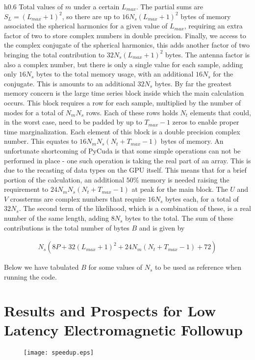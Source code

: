 \documentclass[paper=a4, fontsize=11pt]{scrartcl} %
\numberwithin{equation}{section} %
\numberwithin{figure}{section} %
\numberwithin{table}{section} %
\begin{document}
\begin{wrapfigure}{h}{0.6\textwidth}
Total values of $m$ under a certain $L_{max}$. The partial sums are $S_L = (L_{max} + 1)^2$, so there are up to $16N_s(L_{max}+1)^2$ bytes of memory associated the spherical harmonics for a given value of $L_{max}$, requiring an extra factor of two to store complex numbers in double precision. Finally, we access to the complex conjugate of the spherical harmonics, this adds another factor of two bringing the total contribution to $32N_s(L_{max}+1)^2$ bytes.  
The antenna factor is also a complex number, but there is only a single value for each sample, adding only $16N_s$ bytes to the total memory usage, with an additional $16N_s$ for the conjugate. This is amounts to an additional $32N_s$ bytes. 
By far the greatest memory concern is the large time series block inside which the main calculation occurs. This block requires a row for each sample, multiplied by the number of modes for a total of $N_m N_s$ rows. Each of these rows holds $N_t$ elements that could, in the worst case, need to be padded by up to $T_{max} - 1$ zeros to enable proper time marginalization. Each element of this block is a double precision complex number. This equates to $16N_m N_s (N_t + T_{max} - 1)$ bytes of memory. An unfortunate shortcoming of PyCuda is that some simple operations can not be performed in place - one such operation is taking the real part of an array. This is due to the recasting of data types on the GPU itself. This means that for a brief portion of the calculation, an additional $50\%$ memory is needed raising the requirement to $24N_m N_s (N_t + T_{max} - 1)$ at peak for the main block.
The $U$ and $V$ crossterms are complex numbers that require $16N_s$ bytes each, for a total of $32N_s$. The second term of the likelihood, which is a combination of these, is a real number of the same length, adding $8N_s$ bytes to the total.
The sum of these contributions is the total number of bytes $B$ and is given by 

\begin{align}
N_s(8P + 32(L_{max} + 1)^2 +  24N_m(N_t + T_{max} - 1) + 72)
\end{align}

Below we have tabulated $B$ for some values of $N_s$ to be used as reference when running the code.

\section{Results and Prospects for Low Latency Electromagnetic Followup}
\begin{figure}[H!]
\hspace{-5.0cm}
\texttt{[image: speedup.eps]}
\end{figure}


\end{wrapfigure}
\end{document}

